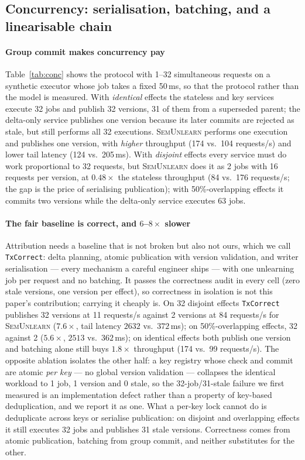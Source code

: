 \documentclass[conference]{IEEEtran}
\newcommand{\sys}{\textsc{SemUnlearn}}
\begin{document}
\subsection{Concurrency: serialisation, batching, and a linearisable chain}
\label{sec:eval-conc}



\paragraph{Group commit makes concurrency pay}
Table~\ref{tab:conc} shows the protocol with 1--32 simultaneous requests on a synthetic
executor whose job takes a fixed 50\,ms, so that the protocol rather than the model is
measured.  With \emph{identical} effects the stateless and key services execute 32 jobs and
publish 32 versions, 31 of them from a superseded parent; the delta-only service publishes one
version because its later commits are rejected as stale, but still performs all 32 executions.
\sys{} performs one execution and publishes one version, with \emph{higher} throughput (174
vs.\ 104 requests/s) and lower tail latency (124 vs.\ 205\,ms).  With \emph{disjoint} effects
every service must do work proportional to 32 requests, but \sys{} does it as 2 jobs with 16
requests per version, at $0.48\times$ the stateless throughput (84 vs.\ 176 requests/s; the gap
is the price of serialising publication); with 50\%-overlapping effects it commits two versions
while the delta-only service executes 63 jobs.

\paragraph{The fair baseline is correct, and $6$--$8\times$ slower}
Attribution needs a baseline that is not broken but also not ours, which we call
\texttt{TxCorrect}: delta planning, atomic publication with version validation, and writer
serialisation --- every mechanism a careful engineer ships --- with one unlearning job per
request and no batching.  It passes the correctness audit in every cell (zero stale
versions, one version per effect), so correctness in isolation is not this paper's
contribution; carrying it cheaply is.  On 32 disjoint effects \texttt{TxCorrect} publishes
32 versions at 11 requests/s against 2 versions at 84 requests/s for \sys{}
($7.6\times$, tail latency $2632$ vs.\ $372$\,ms); on 50\%-overlapping effects, 32 against
2 ($5.6\times$, $2513$ vs.\ $362$\,ms); on identical effects both publish one version and
batching alone still buys $1.8\times$ throughput (174 vs.\ 99 requests/s).  The opposite
ablation isolates the other half: a key registry whose check and commit are atomic
\emph{per key} --- no global version validation --- collapses the identical workload to
1 job, 1 version and 0 stale, so the 32-job/31-stale failure we first measured is an
implementation defect rather than a property of key-based deduplication, and we report it
as one.  What a per-key lock cannot do is deduplicate across keys or serialise publication:
on disjoint and overlapping effects it still executes 32 jobs and publishes 31 stale
versions.  Correctness comes from atomic publication, batching from group commit, and
neither substitutes for the other.
\end{document}
